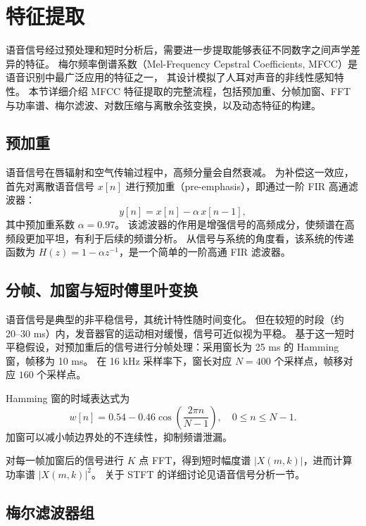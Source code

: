 \section{特征提取}

语音信号经过预处理和短时分析后，需要进一步提取能够表征不同数字之间声学差异的特征。
梅尔频率倒谱系数（Mel-Frequency Cepstral Coefficients, MFCC）是语音识别中最广泛应用的特征之一，
其设计模拟了人耳对声音的非线性感知特性。
本节详细介绍 MFCC 特征提取的完整流程，包括预加重、分帧加窗、FFT 与功率谱、梅尔滤波、对数压缩与离散余弦变换，以及动态特征的构建。

\subsection{预加重}

语音信号在唇辐射和空气传输过程中，高频分量会自然衰减。
为补偿这一效应，首先对离散语音信号 $x[n]$ 进行预加重（pre-emphasis），即通过一阶 FIR 高通滤波器：
\begin{equation}
  y[n] = x[n] - \alpha\,x[n-1],
\end{equation}
其中预加重系数 $\alpha = 0.97$。
该滤波器的作用是增强信号的高频成分，使频谱在高频段更加平坦，有利于后续的频谱分析。
从信号与系统的角度看，该系统的传递函数为 $H(z) = 1 - \alpha z^{-1}$，是一个简单的一阶高通 FIR 滤波器。

\subsection{分帧、加窗与短时傅里叶变换}

语音信号是典型的非平稳信号，其统计特性随时间变化。
但在较短的时段（约 20--30 ms）内，发音器官的运动相对缓慢，信号可近似视为平稳。
基于这一短时平稳假设，对预加重后的信号进行分帧处理：采用窗长为 25 ms 的 Hamming 窗，帧移为 10 ms。
在 16 kHz 采样率下，窗长对应 $N = 400$ 个采样点，帧移对应 $160$ 个采样点。

Hamming 窗的时域表达式为
\begin{equation}
  w[n] = 0.54 - 0.46\cos\left(\frac{2\pi n}{N-1}\right),\quad 0 \le n \le N-1.
\end{equation}
加窗可以减小帧边界处的不连续性，抑制频谱泄漏。

对每一帧加窗后的信号进行 $K$ 点 FFT，得到短时幅度谱 $|X(m,k)|$，进而计算功率谱 $|X(m,k)|^2$。
关于 STFT 的详细讨论见语音信号分析一节。

\subsection{梅尔滤波器组}

